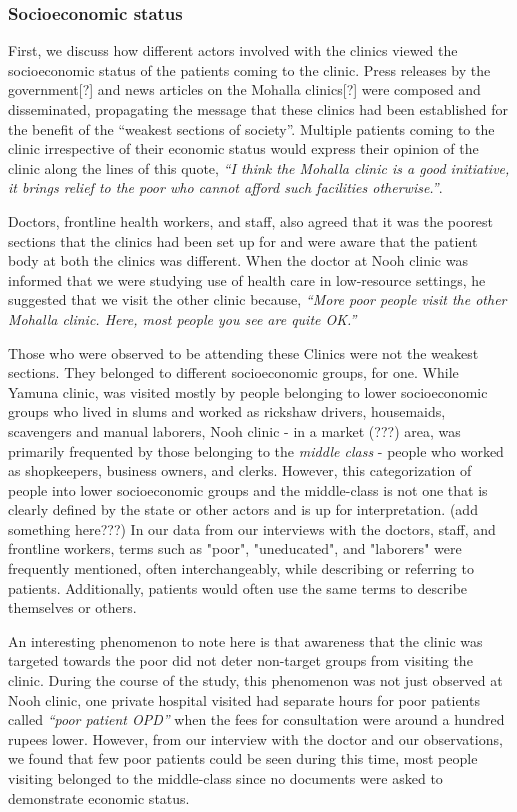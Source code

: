 \subsubsection{Socioeconomic status}
First, we discuss how different actors involved with the clinics viewed the socioeconomic status of the patients coming to the clinic. %
Press releases by the government[?] and news articles on the Mohalla clinics[?] were composed and disseminated, propagating the message that these clinics had been established for the benefit of the ``weakest sections of society''. Multiple patients coming to the clinic irrespective of their economic status would express their opinion of the clinic along the lines of this quote, \textit{``I think the Mohalla clinic is a good initiative, it brings relief to the poor who cannot afford such facilities otherwise.''}. 

Doctors, frontline health workers, and staff, also agreed that it was the poorest sections that the clinics had been set up for and were aware that the patient body at both the clinics was different. When the doctor at Nooh clinic was informed that we were studying use of health care in low-resource settings, he suggested that we visit the other clinic because, \textit{``More poor people visit the other Mohalla clinic. Here, most people you see are quite OK.''}

Those who were observed to be attending these Clinics were not the weakest sections. They belonged to different socioeconomic groups, for one. While Yamuna clinic, was visited mostly by people belonging to lower socioeconomic groups who lived in slums and worked as rickshaw drivers, housemaids, scavengers and manual laborers, Nooh clinic - in a market (???) area, was primarily frequented by those belonging to the \textit{middle class} - people who worked as shopkeepers, business owners, and clerks. However, this categorization of people into lower socioeconomic groups and the middle-class is not one that is clearly defined by the state or other actors and is up for interpretation. (add something here???) In our data from our interviews with the doctors, staff, and frontline workers, terms such as "poor", "uneducated", and "laborers" were frequently mentioned, often interchangeably, while describing or referring to patients. Additionally, patients would often use the same terms to describe themselves or others.

An interesting phenomenon to note here is that awareness that the clinic was targeted towards the poor did not deter non-target groups from visiting the clinic. During the course of the study, this phenomenon was not just observed at Nooh clinic, one private hospital visited had separate hours for poor patients called \textit{``poor patient OPD''} when the fees for consultation were around a hundred rupees lower. However, from our interview with the doctor and our observations, we found that few poor patients could be seen during this time, most people visiting belonged to the middle-class since no documents were asked to demonstrate economic status.

